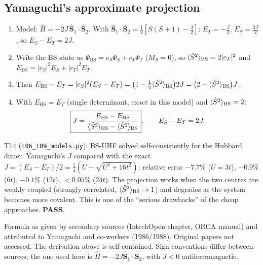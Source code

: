 \subsection{Yamaguchi's approximate projection}
\begin{enumerate}
  \item Model: $\hat H=-2J\,\hat{\mathbf S}_1\cdot\hat{\mathbf S}_2$. With $\hat{\mathbf S}_1\cdot\hat{\mathbf S}_2=\tfrac12[S(S+1)-\tfrac32]$:
        $E_T=-\tfrac J2$, $E_S=\tfrac{3J}2$, so $E_S-E_T=2J$.
  \item Write the BS state as $\Psi_{\text{BS}}=c_S\Psi_S+c_T\Psi_T$ ($M_S=0$), so $\langle \hat S^2\rangle_{\text{BS}}=2|c_T|^2$ and
        $E_{\text{BS}}=|c_S|^2E_S+|c_T|^2E_T$.
  \item Then $E_{\text{BS}}-E_T=|c_S|^2(E_S-E_T)=\bigl(1-\tfrac12\langle \hat S^2\rangle_{\text{BS}}\bigr)2J=\bigl(2-\langle \hat S^2\rangle_{\text{BS}}\bigr)J$.
  \item With $E_{\text{HS}}=E_T$ (single determinant, exact in this model) and $\langle \hat S^2\rangle_{\text{HS}}=2$:
        \begin{equation}\label{eq:yamaguchi}
          \boxed{J=\frac{E_{\text{BS}}-E_{\text{HS}}}{\langle \hat S^2\rangle_{\text{HS}}-\langle \hat S^2\rangle_{\text{BS}}}},\qquad E_S-E_T=2J .
        \end{equation}
\end{enumerate}
\begin{verifybox}
T14 (\texttt{t06\_t09\_models.py}): BS-UHF solved self-consistently for the Hubbard dimer.
Yamaguchi's $J$ compared with the exact $J=(E_S-E_T)/2=\tfrac14(U-\sqrt{U^2+16t^2})$:
relative error $-7.7\%$ ($U=3t$), $-0.9\%$ ($6t$), $-0.1\%$ ($12t$), $<0.05\%$ ($24t$). The projection works when the
two centres are weakly coupled (strongly correlated, $\langle \hat S^2\rangle_{\text{BS}}\to1$) and degrades as the
system becomes more covalent. This is one of the ``serious drawbacks'' of the cheap approaches. \textbf{PASS}.
\end{verifybox}
\begin{sourcebox}
Formula as given by secondary sources (IntechOpen chapter, ORCA manual) and attributed to Yamaguchi and
co-workers (1986/1988). Original papers not accessed. The derivation above is self-contained. Sign
conventions differ between sources; the one used here is $\hat H=-2J\hat{\mathbf S}_1\cdot\hat{\mathbf S}_2$, with $J<0$
antiferromagnetic.
\end{sourcebox}
